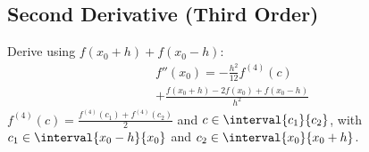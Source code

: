\documentclass{article}
\begin{document}
\begin{minipage}[t]{62.39259259mm}
    \subsection{Second Derivative (Third Order)}
    Derive using \(f\left( x_0 + h \right) + f\left( x_0 - h \right)\):
    \begin{multline*}
        f''\left( x_0 \right) = - \frac{h^2}{12} f^{\left( 4 \right)}\left( c \right) \\
        + \frac{f\left( x_0 + h \right) - 2f\left( x_0 \right) + f\left( x_0 - h \right)}{h^2}
    \end{multline*}
    \(f^{\left( 4 \right)}\left( c \right) = \frac{f^{\left( 4 \right)}\left( c_1 \right) + f^{\left( 4 \right)}\left( c_2 \right)}{2}\) and \(c \in \interval{c_1}{c_2}\),
    with \(c_1 \in \interval{x_0 - h}{x_0}\) and \(c_2 \in \interval{x_0}{x_0 + h}\).
\end{minipage}\hfill%
\end{document}
